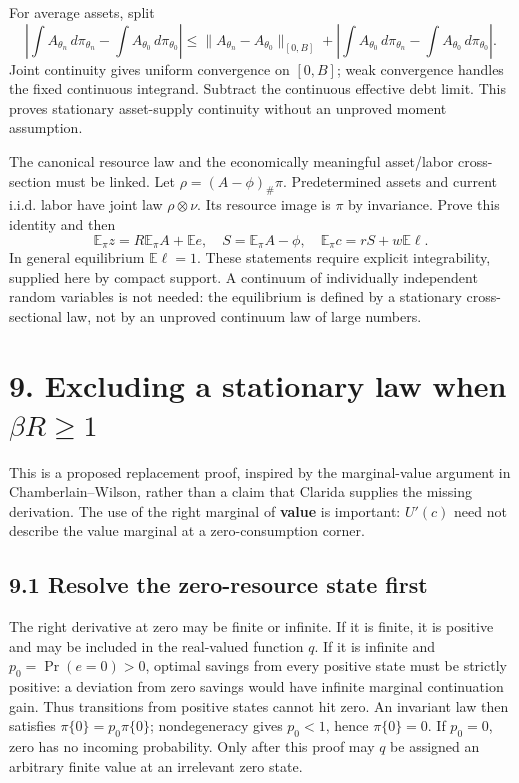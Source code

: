 \documentclass[
  11pt,
]{article}
\begin{document}
For average assets, split \[
\left|\int A_{\theta_n}\,d\pi_{\theta_n}-\int A_{\theta_0}\,d\pi_{\theta_0}\right|
\leq\|A_{\theta_n}-A_{\theta_0}\|_{[0,B]}
+\left|\int A_{\theta_0}\,d\pi_{\theta_n}-\int A_{\theta_0}\,d\pi_{\theta_0}\right|.
\] Joint continuity gives uniform convergence on \([0,B]\); weak
convergence handles the fixed continuous integrand. Subtract the
continuous effective debt limit. This proves stationary asset-supply
continuity without an unproved moment assumption.

The canonical resource law and the economically meaningful asset/labor
cross-section must be linked. Let \(\rho=(A-\phi)_\#\pi\). Predetermined
assets and current i.i.d. labor have joint law \(\rho\otimes\nu\). Its
resource image is \(\pi\) by invariance. Prove this identity and then \[
\mathbb E_\pi z=R\mathbb E_\pi A+\mathbb E e,
\quad S=\mathbb E_\pi A-\phi,
\quad \mathbb E_\pi c=rS+w\mathbb E\ell.
\] In general equilibrium \(\mathbb E\ell=1\). These statements require
explicit integrability, supplied here by compact support. A continuum of
individually independent random variables is not needed: the equilibrium
is defined by a stationary cross-sectional law, not by an unproved
continuum law of large numbers.

\section{\texorpdfstring{9. Excluding a stationary law when
\(\beta R\geq1\)}{9. Excluding a stationary law when \textbackslash beta R\textbackslash geq1}}\label{excluding-a-stationary-law-when-beta-rgeq1}

This is a proposed replacement proof, inspired by the marginal-value
argument in Chamberlain--Wilson, rather than a claim that Clarida
supplies the missing derivation. The use of the right marginal of
\textbf{value} is important: \(U'(c)\) need not describe the value
marginal at a zero-consumption corner.

\subsection{9.1 Resolve the zero-resource state
first}\label{resolve-the-zero-resource-state-first}

The right derivative at zero may be finite or infinite. If it is finite,
it is positive and may be included in the real-valued function \(q\). If
it is infinite and \(p_0=\Pr(e=0)>0\), optimal savings from every
positive state must be strictly positive: a deviation from zero savings
would have infinite marginal continuation gain. Thus transitions from
positive states cannot hit zero. An invariant law then satisfies
\(\pi\{0\}=p_0\pi\{0\}\); nondegeneracy gives \(p_0<1\), hence
\(\pi\{0\}=0\). If \(p_0=0\), zero has no incoming probability. Only
after this proof may \(q\) be assigned an arbitrary finite value at an
irrelevant zero state.
\end{document}
